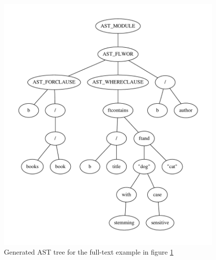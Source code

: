 \begin{figure}[h!]

\caption{Full-text XQuery expression used to generate the AST in figure
\ref{tree:ast:ftq1}}
\label{code:xq:ftq1}
\centering
 \includegraphics[scale=0.55]{img/graphs/ftq1}
\caption{Generated AST tree for the full-text example in figure \ref{tree:ast:ftq1}}
\label{tree:ast:ftq1}
\end{figure}
